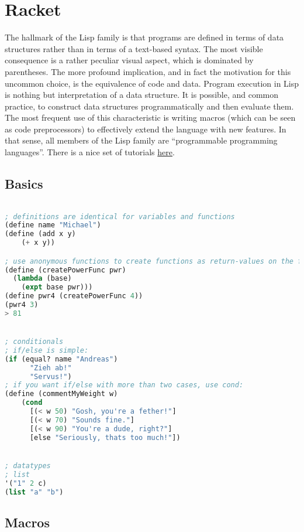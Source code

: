 \section{Racket}

The hallmark of the Lisp family is that programs are defined in terms of data structures rather than in terms of a text-based syntax. The most visible consequence is a rather peculiar visual aspect, which is dominated by parentheses. The more profound implication, and in fact the motivation for this uncommon choice, is the equivalence of code and data. Program execution in Lisp is nothing but interpretation of a data structure. It is possible, and common practice, to construct data structures programmatically and then evaluate them. The most frequent use of this characteristic is writing macros (which can be seen as code preprocessors) to effectively extend the language with new features. In that sense, all members of the Lisp family are “programmable programming languages”. 
There is a nice set of tutorials \href{https://beautifulracket.com/stacker/}{here}.

\subsection{Basics}
\begin{lstlisting}[language=lisp]

; definitions are identical for variables and functions
(define name "Michael")
(define (add x y)
    (+ x y))

; use anonymous functions to create functions as return-values on the fly
(define (createPowerFunc pwr)
  (lambda (base)
    (expt base pwr)))
(define pwr4 (createPowerFunc 4))
(pwr4 3)
> 81


; conditionals
; if/else is simple:
(if (equal? name "Andreas")
      "Zieh ab!"
      "Servus!")
; if you want if/else with more than two cases, use cond:
(define (commentMyWeight w)
    (cond
      [(< w 50) "Gosh, you're a fether!"]
      [(< w 70) "Sounds fine."]
      [(< w 90) "You're a dude, right?"]
      [else "Seriously, thats too much!"])


; datatypes
; list
'("1" 2 c)
(list "a" "b")


\end{lstlisting}

\subsection{Macros}

